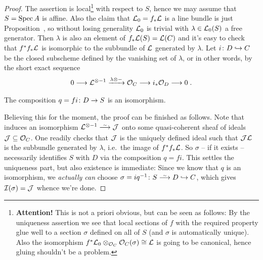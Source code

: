 \documentclass[a4paper,parskip=half,numbers=enddot, DIV=12]{scrreprt}
\begin{document}
\begin{proof}
	The assertion is local\footnote{\textbf{Attention!} This is not a priori obvious, but can be seen as follows: By the uniqueness assertion we see that local sections of $f$ with the required property glue well to a section $\sigma$ defined on all of $S$ (and $\sigma$ is automatically unique). Also the isomorphism $f^*\mathcal{L}_0\otimes_{\mathcal{O}_C}\mathcal{O}_C(\sigma)\cong\mathcal{L}$ is going to be canonical, hence gluing shouldn't be a problem.} with respect to $S$, hence we may assume that $S=\operatorname{Spec} A$ is affine. Also the claim that $\mathcal{L}_0=f_*\mathcal{L}$ is a line bundle is just Proposition~, so without losing generality $\mathcal{L}_0$ is trivial with $\lambda\in\mathcal{L}_0(S)$ a free generator. Then $\lambda$ is also an element of $f_*\mathcal{L}(S)=\mathcal{L}(C)$ and it's easy to check that $f^*f_*\mathcal{L}$ is isomorphic to the subbundle of $\mathcal{L}$ generated by $\lambda$. Let $i\colon D\monomorphism C$ be the closed subscheme defined by the vanishing set of $\lambda$, or in other words, by the short exact sequence
	\begin{align}\lbl{eq:SESforD}
		0\morphism\Ll^{\otimes -1}\xrightarrow{\lambda\otimes-}\Oo_C\morphism i_*\Oo_D\morphism 0\;.
	\end{align}
	\begin{claim}
		The composition $q=fi\colon D\morphism S$ is an isomorphism.
	\end{claim}
	Believing this for the moment, the proof can be finished as follows. Note that  induces an isomorphism $\Ll^{\otimes -1}\isomorphism\Jj$ onto some quasi-coherent sheaf of ideals $\mathcal{J}\subseteq \mathcal{O}_C$. One readily checks that $\mathcal{J}$ is the uniquely defined ideal such that $\mathcal{J}\mathcal{L}$ is the subbundle generated by $\lambda$, i.e.\ the image of $f^*f_*\mathcal{L}$. So $\sigma$ -- if it exists -- necessarily identifies $S$ with $D$ via the composition $q=fi$. This settles the uniqueness part, but also existence is immediate: Since we know that $q$ is an isomorphism, we \emph{actually can} choose $\sigma=iq^{-1}\colon S\isomorphism D\monomorphism C$, which gives $\mathcal{I}(\sigma)=\mathcal{J}$ whence we're done.
	

\end{proof}
\end{document}
